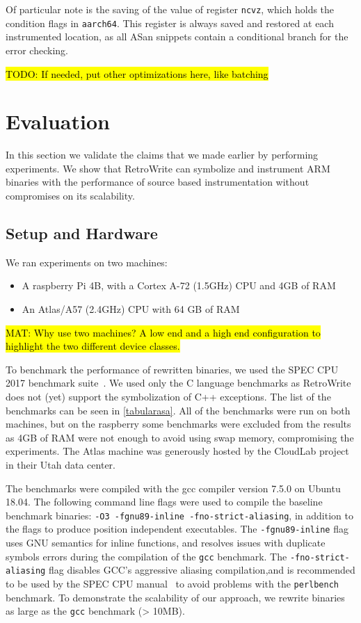 \documentclass[a4paper,11pt,oneside]{report}
\newcommand{\sysname}{RetroWrite\xspace}
\DeclareRobustCommand{\todo}[1]{{\sethlcolor{cyan}\hl{TODO: #1}}}
\DeclareRobustCommand{\mat}[1]{{\sethlcolor{red}\hl{MAT: #1}}}
\begin{document}
Of particular note is the saving of the value of register \texttt{ncvz}, which 
holds the condition flags in \texttt{aarch64}. This register is always saved 
and restored at each instrumented location, as all ASan snippets contain a 
conditional branch for the error checking. 

\todo{If needed, put other optimizations here, like batching}


\chapter{Evaluation}


In this section we validate the claims that we made earlier by performing experiments.
We show that \sysname can symbolize and instrument ARM binaries with the performance of
source based instrumentation without compromises on its scalability.

\section{Setup and Hardware} 
We ran experiments on two machines:
\begin{itemize}
	\item A raspberry Pi 4B, with a Cortex A-72 (1.5GHz) CPU and 4GB of RAM
	\item An Atlas/A57 (2.4GHz) CPU with 64 GB of RAM
\end{itemize}

\mat{Why use two machines? A low end and a high end configuration to highlight the two different
device classes.}

To benchmark the performance of rewritten binaries, we used the SPEC CPU 2017
benchmark suite~\cite{speccpu2017}.  We used only the C language benchmarks as
\sysname does not (yet) support the symbolization of C++ exceptions. The list of the
benchmarks can be seen in \autoref{tabularasa}.  All of the benchmarks were run on
both machines, but on the raspberry some benchmarks were excluded from the results
as 4GB of RAM were not enough to avoid using swap memory, compromising the
experiments. The Atlas machine was generously hosted by the
CloudLab project~\cite{cloudlab} in their Utah data center. 

The benchmarks were compiled with the gcc compiler version 7.5.0 on Ubuntu
18.04. The following command line flags were used to compile the baseline
benchmark binaries: \texttt{-O3 -fgnu89-inline -fno-strict-aliasing}, in
addition to the flags to produce position independent executables. 
The \texttt{-fgnu89-inline} flag uses GNU semantics for inline functions, and
resolves issues with duplicate symbols errors during the compilation of the
\texttt{gcc} benchmark.  The \texttt{-fno-strict-aliasing} flag disables GCC's
aggressive aliasing compilation,and is recommended to be used by the SPEC CPU
manual~\cite{specaliasing} to avoid problems with the \texttt{perlbench}
benchmark.  To demonstrate the scalability of our approach, we rewrite
binaries as large as the \texttt{gcc} benchmark (> 10MB).
\end{document}
